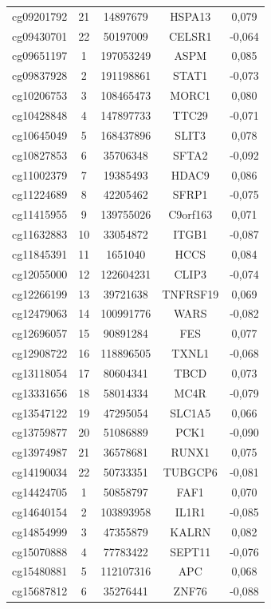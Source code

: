 \documentclass[12pt,a4paper]{article}
\begin{document}
\begin{longtable}{|c|c|c|c|c|}
		cg09201792 & 21 & 14897679 & HSPA13 & 0,079 \\
		cg09430701 & 22 & 50197009 & CELSR1 & -0,064 \\
		cg09651197 & 1 & 197053249 & ASPM & 0,085 \\
		cg09837928 & 2 & 191198861 & STAT1 & -0,073 \\
		cg10206753 & 3 & 108465473 & MORC1 & 0,080 \\
		cg10428848 & 4 & 147897733 & TTC29 & -0,071 \\
		cg10645049 & 5 & 168437896 & SLIT3 & 0,078 \\
		cg10827853 & 6 & 35706348 & SFTA2 & -0,092 \\
		cg11002379 & 7 & 19385493 & HDAC9 & 0,086 \\
		cg11224689 & 8 & 42205462 & SFRP1 & -0,075 \\
		cg11415955 & 9 & 139755026 & C9orf163 & 0,071 \\
		cg11632883 & 10 & 33054872 & ITGB1 & -0,087 \\
		cg11845391 & 11 & 1651040 & HCCS & 0,084 \\
		cg12055000 & 12 & 122604231 & CLIP3 & -0,074 \\
		cg12266199 & 13 & 39721638 & TNFRSF19 & 0,069 \\
		cg12479063 & 14 & 100991776 & WARS & -0,082 \\
		cg12696057 & 15 & 90891284 & FES & 0,077 \\
		cg12908722 & 16 & 118896505 & TXNL1 & -0,068 \\
		cg13118054 & 17 & 80604341 & TBCD & 0,073 \\
		cg13331656 & 18 & 58014334 & MC4R & -0,079 \\
		cg13547122 & 19 & 47295054 & SLC1A5 & 0,066 \\
		cg13759877 & 20 & 51086889 & PCK1 & -0,090 \\
		cg13974987 & 21 & 36578681 & RUNX1 & 0,075 \\
		cg14190034 & 22 & 50733351 & TUBGCP6 & -0,081 \\
		cg14424705 & 1 & 50858797 & FAF1 & 0,070 \\
		cg14640154 & 2 & 103893958 & IL1R1 & -0,085 \\
		cg14854999 & 3 & 47355879 & KALRN & 0,082 \\
		cg15070888 & 4 & 77783422 & SEPT11 & -0,076 \\
		cg15480881 & 5 & 112107316 & APC & 0,068 \\
		cg15687812 & 6 & 35276441 & ZNF76 & -0,088 \\

\end{longtable}
\end{document}

